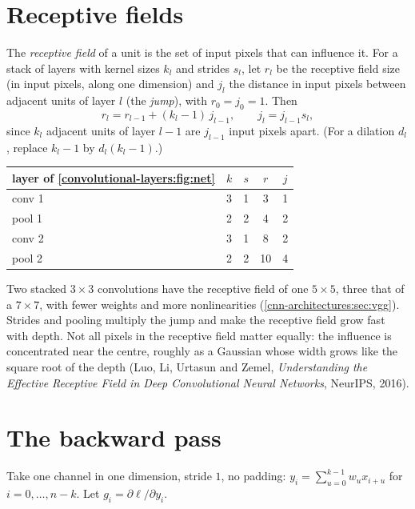 \begin{notechapter}
\section{Receptive fields}\label{convolutional-layers:sec:receptive}

The \emph{receptive field} of a unit is the set of input pixels that can influence it. For a stack of
layers with kernel sizes $k_l$ and strides $s_l$, let $r_l$ be the receptive field size (in input pixels,
along one dimension) and $j_l$ the distance in input pixels between adjacent units of layer $l$
(the \emph{jump}), with $r_0 = j_0 = 1$. Then
\[
  r_l = r_{l-1} + (k_l - 1)\,j_{l-1},\qquad j_l = j_{l-1}s_l ,
\]
since $k_l$ adjacent units of layer $l - 1$ are $j_{l-1}$ input pixels apart. (For a dilation $d_l$, replace $k_l - 1$
by $d_l(k_l - 1)$.)

\begin{center}
\begin{tabular}{lcccc}
\toprule
layer of \cref{convolutional-layers:fig:net} & $k$ & $s$ & $r$ & $j$ \\
\midrule
conv 1 & 3 & 1 & 3 & 1 \\
pool 1 & 2 & 2 & 4 & 2 \\
conv 2 & 3 & 1 & 8 & 2 \\
pool 2 & 2 & 2 & 10 & 4 \\
\bottomrule
\end{tabular}
\end{center}

Two stacked $3\times3$ convolutions have the receptive field of one $5\times5$, three that of a $7\times7$, with fewer
weights and more nonlinearities (\cref{cnn-architectures:sec:vgg}). Strides and pooling
multiply the jump and make the receptive field grow fast with depth. Not all pixels in the
receptive field matter equally: the influence is concentrated near the centre, roughly as a
Gaussian whose width grows like the square root of the depth (Luo, Li, Urtasun and Zemel,
\emph{Understanding the Effective Receptive Field in Deep Convolutional Neural Networks},
NeurIPS, 2016).

\section{The backward pass}\label{convolutional-layers:sec:backward}

Take one channel in one dimension, stride $1$, no padding: $y_i = \sum_{u=0}^{k-1}w_ux_{i+u}$ for $i = 0,\dots,n - k$. Let
$g_i = \partial\ell/\partial y_i$.


\end{notechapter}
